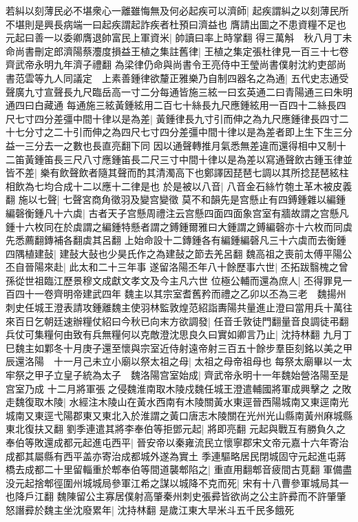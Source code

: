 若糾以刻薄民必不堪衆心一離雖悔無及何必起疾可以濟師|{
	起疾謂糾之以刻薄民所不堪則是興長病端一曰起疾謂起詐疾者杜預曰濟益也}
膺請出圖之不患資糧不足也元起曰善一以委卿膺退帥富民上軍資米|{
	帥讀曰率上時掌翻}
得三萬斛　秋八月丁未命尚書刪定郎濟陽蔡灋度損益王植之集註舊律|{
	王植之集定張杜律見一百三十七卷齊武帝永明九年濟子禮翻}
為梁律仍命與尚書令王亮侍中王瑩尚書僕射沈約吏部尚書范雲等九人同議定　上素善鍾律欲釐正雅樂乃自制四器名之為通|{
	五代史志通受聲廣九寸宣聲長九尺臨岳高一寸二分每通皆施三絃一曰玄英通二曰青陽通三曰朱明通四曰白藏通}
每通施三絃黃鍾絃用二百七十絲長九尺應鍾絃用一百四十二絲長四尺七寸四分差彊中間十律以是為差|{
	黃鍾律長九寸引而伸之為九尺應鍾律長四寸二十七分寸之二十引而伸之為四尺七寸四分差彊中間十律以是為差者即上生下生三分益一三分去一之數也長直亮翻下同}
因以通聲轉推月氣悉無差違而還得相中又制十二笛黃鍾笛長三尺八寸應鍾笛長二尺三寸中間十律以是為差以寫通聲飲古鍾玉律並皆不差|{
	樂有飲聲飲者隨其聲而酌其清濁高下也鄭譯因琵琶七調以其所捻琵琶絃柱相飲為七均合成十二以應十二律是也}
於是被以八音|{
	八音金石絲竹匏土革木被皮義翻}
施以七聲|{
	七聲宮商角徵羽及變宫變徵}
莫不和韻先是宫懸止有四鎛鍾雜以編鍾編磬衡鍾凡十六虡|{
	古者天子宫懸周禮注云宫懸四面四面象宫室有牆故謂之宫懸凡鍾十六枚同在於虡謂之編鍾特懸者謂之鎛鍾爾雅曰大鍾謂之鎛編磬亦十六枚而同虡先悉薦翻鏄補各翻虡其呂翻}
上始命設十二鏄鍾各有編鍾編磬凡三十六虡而去衡鍾四隅植建鼔|{
	建鼔大鼔也少昊氏作之為建鼔之節去羌呂翻}
魏高祖之喪前太傅平陽公丕自晉陽來赴|{
	此太和二十三年事}
遂留洛陽丕年八十餘歷事六世|{
	丕拓跋翳槐之曾孫從世祖臨江歷景穆文成獻文孝文及今主凡六世}
位極公輔而還為庶人|{
	丕得罪見一百四十一卷齊明帝建武四年}
魏主以其宗室耆舊矜而禮之乙卯以丕為三老　魏揚州刺史任城王澄表請攻鍾離魏主使羽林監敦煌范紹詣夀陽共量進止澄曰當用兵十萬往來百日乞朝廷速辦糧仗紹曰今秋已向末方欲調發|{
	任音壬敦徒門翻量音良調徒弔翻}
兵仗可集糧何由致有兵無糧何以克敵澄沈思良久曰實如卿言乃止|{
	沈持林翻}
九月丁巳魏主如鄴冬十月庚子還至懷與宗室近侍射遠帝射三百五十餘步羣臣刻銘以美之甲辰還洛陽　十一月己未立小廟以祭太祖之母|{
	太祖之母帝祖母也}
每祭太廟畢以一太牢祭之甲子立皇子統為太子　魏洛陽宫室始成|{
	齊武帝永明十一年魏始營洛陽至是宫室乃成}
十二月將軍張之侵魏淮南取木陵戍魏任城王澄遣輔國將軍成興擊之之敗走魏復取木陵|{
	水經注木陵山在黃水西南有木陵關黃水東逕晉西陽城南又東逕南光城南又東逕弋陽郡東又東北入於淮謂之黃口唐志木陵關在光州光山縣南黃州麻城縣東北復扶又翻}
劉季連遣其將李奉伯等拒鄧元起|{
	將即亮翻}
元起與戰互有勝負久之奉伯等敗還成都元起進屯西平|{
	晉安帝以秦雍流民立懷寧郡宋文帝元嘉十六年寄治成都其屬縣有西平盖亦寄治成都城外遂為實土}
季連驅略居民閉城固守元起進屯蔣橋去成都二十里留輜重於郫奉伯等間道襲郫陷之|{
	重直用翻郫音疲間古莧翻}
軍備盡没元起捨郫徑圍州城城局參軍江希之謀以城降不克而死|{
	宋有十八曹參軍城局其一也降戶江翻}
魏陳留公主寡居僕射高肇秦州刺史張彛皆欲尚之公主許彛而不許肇肇怒譖彛於魏主坐沈廢累年|{
	沈持林翻}
是歲江東大旱米斗五千民多餓死

